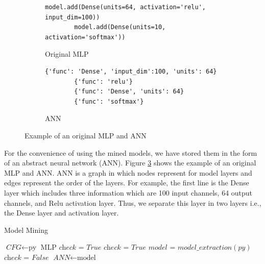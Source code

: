 \begin{figure}
	\vspace{-15pt}
	\centering
	\begin{subfigure}[b]{.45\linewidth}
		\begin{lstlisting}[basicstyle=\footnotesize,numberblanklines=false]
		model.add(Dense(units=64, activation='relu', input_dim=100)) 
		model.add(Dense(units=10, activation='softmax'))\end{lstlisting}
		\caption{Original MLP}
		\label{fig:originalCNN}
	\end{subfigure}
	\begin{subfigure}[b]{.52\linewidth}
		\begin{lstlisting}[basicstyle=\footnotesize,numberblanklines=false]	
		{'func': 'Dense', 'input_dim':100, 'units': 64} 
		{'func': 'relu'}
		{'func': 'Dense', 'units': 64}
		{'func': 'softmax'}\end{lstlisting}
		\caption{ANN}
		\label{fig:convertedCNN}
	\end{subfigure}
	\caption{Example of an original MLP and ANN}
	\label{fig:converted}
\end{figure}



For the convenience of using the mined models, we have stored them in the form of an abstract neural network (ANN). Figure \ref{fig:converted} shows the example of an original MLP and ANN. ANN is a graph in which nodes represent for model layers and edges represent the order of the layers. For example, the first line is the Dense layer which includes three information which are 100 input channels, 64 output channels, and Relu activation layer. Thus, we separate this layer in two layers i.e., the Dense layer and activation layer.
\begin{algorithm}
	\caption{Model Mining}\label{euclid}
	\begin{algorithmic}[1]
			\State $\textit{CFG} \gets \text{py}$
			\State \Return MLP
		\EndProcedure
		\State $\textit{check = True} $
			\State $\textit{check = True} $
			\State $model$ = $model\_extraction(py)$ 
					\State $\textit{check = False} $
				\EndIf
			\EndFor
				\State $\textit{ANN}  \gets \text{model}$
			\EndIf
		\EndFor
		
		\EndProcedure	
	\end{algorithmic}
\end{algorithm}


